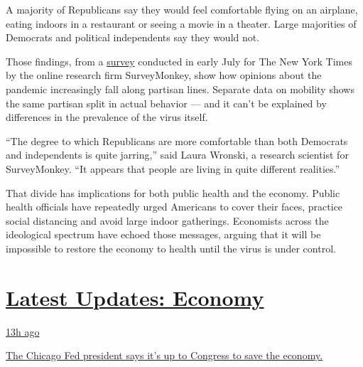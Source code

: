 A majority of Republicans say they would feel comfortable flying on an
airplane, eating indoors in a restaurant or seeing a movie in a theater.
Large majorities of Democrats and political independents say they would
not.

Those findings, from a
\href{https://www.surveymonkey.com/curiosity/nyt-july-2020-cci/}{survey}
conducted in early July for The New York Times by the online research
firm SurveyMonkey, show how opinions about the pandemic increasingly
fall along partisan lines. Separate data on mobility shows the same
partisan split in actual behavior --- and it can't be explained by
differences in the prevalence of the virus itself.

``The degree to which Republicans are more comfortable than both
Democrats and independents is quite jarring,'' said Laura Wronski, a
research scientist for SurveyMonkey. ``It appears that people are living
in quite different realities.''

That divide has implications for both public health and the economy.
Public health officials have repeatedly urged Americans to cover their
faces, practice social distancing and avoid large indoor gatherings.
Economists across the ideological spectrum have echoed those messages,
arguing that it will be impossible to restore the economy to health
until the virus is under control.

\hypertarget{latest-updates-economy}{%
\section{\texorpdfstring{\href{https://www.nytimes.com/live/2020/08/03/business/stock-market-today-coronavirus?action=click\&pgtype=Article\&state=default\&region=MAIN_CONTENT_1\&context=storylines_live_updates}{Latest
Updates:
Economy}}{Latest Updates: Economy}}\label{latest-updates-economy}}

\href{https://www.nytimes.com/live/2020/08/03/business/stock-market-today-coronavirus?action=click\&pgtype=Article\&state=default\&region=MAIN_CONTENT_1\&context=storylines_live_updates\#the-chicago-fed-president-says-its-up-to-congress-to-save-the-economy}{13h
ago}

\href{https://www.nytimes.com/live/2020/08/03/business/stock-market-today-coronavirus?action=click\&pgtype=Article\&state=default\&region=MAIN_CONTENT_1\&context=storylines_live_updates\#the-chicago-fed-president-says-its-up-to-congress-to-save-the-economy}{The
Chicago Fed president says it's up to Congress to save the economy.}


